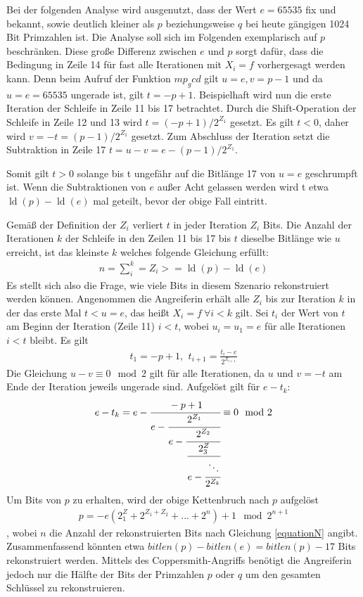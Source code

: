 Bei der folgenden Analyse wird ausgenutzt, dass der Wert $e=65535$ fix und bekannt, sowie deutlich kleiner als $p$ beziehungsweise $q$ bei heute gängigen 1024 Bit Primzahlen ist.
Die Analyse soll sich im Folgenden exemplarisch auf $p$ beschränken.
Diese große Differenz zwischen $e$ und $p$ sorgt dafür, dass die Bedingung in Zeile 14 für fast alle Iterationen mit $X_i = f$ vorhergesagt werden kann.
Denn beim Aufruf der Funktion $mp_gcd$ gilt $u=e, v=p-1$ und da $u=e=65535$ ungerade ist, gilt $t=-p+1$.
Beispielhaft wird nun die erste Iteration der Schleife in Zeile 11 bis 17 betrachtet.
Durch die Shift-Operation der Schleife in Zeile 12 und 13 wird $t=(-p+1)/2^{Z_1}$ gesetzt.
Es gilt $t<0$, daher wird $v=-t=(p-1)/2^{Z_1}$ gesetzt. 
Zum Abschluss der Iteration setzt die Subtraktion in Zeile 17 $t=u-v=e-(p-1)/2^{Z_1}$.

Somit gilt $t>0$ solange bis t ungefähr auf die Bitlänge 17 von $u=e$ geschrumpft ist.
Wenn die Subtraktionen von $e$ außer Acht gelassen werden wird t etwa $\operatorname{ld}(p) - \operatorname{ld}(e)$ mal geteilt, bevor der obige Fall eintritt.

Gemäß der Definition der $Z_i$ verliert $t$ in jeder Iteration $Z_i$ Bits. 
Die Anzahl der Iterationen $k$ der Schleife in den Zeilen 11 bis 17 bis $t$ dieselbe Bitlänge wie $u$ erreicht, ist das kleinste $k$ welches folgende Gleichung erfüllt: 
\begin{align}
\label{equationN}
n = \sum\limits_i^k = Z_i >= \operatorname{ld}(p) - \operatorname{ld}(e)
\end{align}
Es stellt sich also die Frage, wie viele Bits in diesem Szenario rekonstruiert werden können.
Angenommen die Angreiferin erhält alle $Z_i$ bis zur Iteration $k$ in der das erste Mal $t<u=e$, das heißt $X_i=f \: \forall i < k$ gilt.
Sei $t_i$ der Wert von $t$ am Beginn der Iteration (Zeile 11) $i<t$, wobei $u_i=u_1=e$ für alle Iterationen $i<t$ bleibt.
Es gilt 
\begin{align}
t_1=-p+1 \text{, } \: t_{i+1} = \frac{t_i - e}{2^{Z_{i+1}}}
\end{align}
Die Gleichung $u-v \equiv 0 \mod 2$ gilt für alle Iterationen, da $u$ und $v=-t$ am Ende der Iteration jeweils ungerade sind.
Aufgelöst gilt für $e-t_k$:
\begin{align}
e-t_k = e- \cfrac{-p+1}{e - \cfrac{2^{Z_1}}{e- \cfrac{2^{Z_2}}{
          \cfrac{2^Z_3}{e - \cfrac{\ddots}{2^{Z_k}}}}}} \equiv 0 \mod 2
\end{align}
Um Bits von $p$ zu erhalten, wird der obige Kettenbruch nach $p$ aufgelöst
\begin{align}
p = -e(2^Z_1+2^{Z_1+Z_2}+...+2^n)+1 \mod 2^{n+1}
\end{align}
, wobei $n$ die Anzahl der rekonstruierten Bits nach Gleichung \ref{equationN} angibt.
Zusammenfassend könnten etwa $bitlen(p)-bitlen(e)=bitlen(p)-17$ Bits rekonstruiert werden.
Mittels des Coppersmith-Angriffs \cite{CoppersmithBound} benötigt die Angreiferin jedoch nur die Hälfte der Bits der Primzahlen $p$ oder $q$ um den gesamten Schlüssel zu rekonstruieren.

